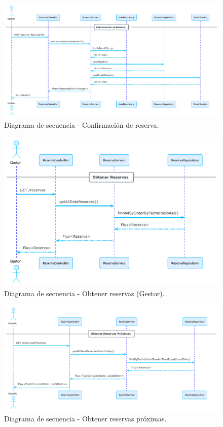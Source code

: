 \begin{figure}[h!tb]
\centering
\includegraphics[width=\textwidth]{figs/secuencia_reserva_confirmacion.pdf}
\caption{Diagrama de secuencia - Confirmación de reserva.\label{fig:secuencia_reserva_confirmacion}}

\end{figure}

\begin{figure}[h!tb]
\centering
\includegraphics[width=\textwidth]{figs/secuencia_reserva_gestor_get.pdf}
\caption{Diagrama de secuencia - Obtener reservas (Gestor).\label{fig:secuencia_reserva_obtener}}
\end{figure}

\begin{figure}[h!tb]
\centering
\includegraphics[width=\textwidth]{figs/secuencia_reserva_proximas.pdf}
\caption{Diagrama de secuencia - Obtener reservas próximas.\label{fig:secuencia_reserva_proximas}}
\end{figure}

